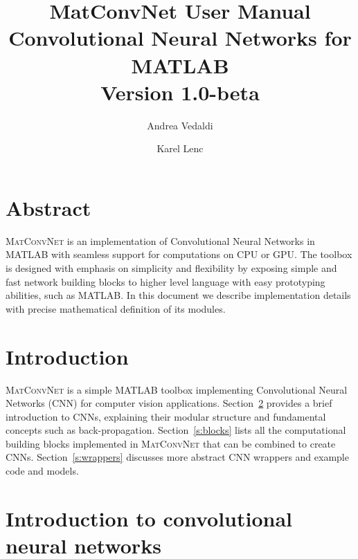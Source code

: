 \documentclass[12pt]{article}
\newcommand{\vlnn}{\textsc{MatConvNet}\xspace}
\begin{document}
\title{MatConvNet User Manual\\
\Large Convolutional Neural Networks for MATLAB\\
Version 1.0-beta}
\author{
Andrea Vedaldi
\and
Karel Lenc}
\date{}
\maketitle{}
\vspace{-3em}
\section*{Abstract}
\vlnn is an implementation of Convolutional Neural Networks in MATLAB with seamless support for computations on CPU or GPU. The toolbox is designed with emphasis on simplicity and flexibility by exposing simple and fast network building blocks to higher level language with easy prototyping abilities, such as MATLAB. In this document we describe implementation details with precise mathematical definition of its modules.

\tableofcontents{}

\section{Introduction}

\vlnn is a simple MATLAB toolbox implementing Convolutional Neural Networks (CNN) for computer vision applications. Section~\ref{s:intro} provides a brief introduction to CNNs, explaining their modular structure and fundamental concepts such as back-propagation. Section~\ref{s:blocks} lists all the computational building blocks implemented in \vlnn that can be combined to create CNNs. Section~\ref{s:wrappers} discusses more abstract CNN wrappers and example code and models.

\section{Introduction to convolutional neural networks}\label{s:intro}
\end{document}
